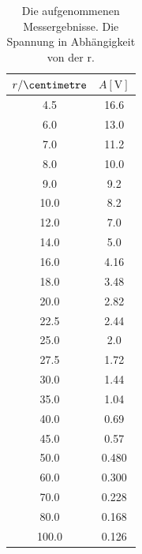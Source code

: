 \begin{table}
  \centering
  \caption{Die aufgenommenen Messergebnisse. Die Spannung in Abhängigkeit von der r. } 
  \label{tab:data_dioden}
  \begin{tabular}{c c}
    \toprule
    $r / \si{\centimetre}$ & $A [\si{\volt}]$\\
    \midrule
    4.5    &   16.6  \\
  6.0    &   13.0  \\
  7.0    &   11.2  \\
  8.0    &   10.0  \\
  9.0    &   9.2   \\
  10.0   &   8.2   \\
  12.0   &   7.0   \\
  14.0   &   5.0   \\
  16.0   &   4.16  \\
  18.0   &   3.48  \\
  20.0   &   2.82  \\
  22.5   &   2.44  \\
  25.0   &   2.0   \\
  27.5   &   1.72  \\
  30.0   &   1.44  \\
  35.0   &   1.04  \\
  40.0   &   0.69  \\
  45.0   &   0.57  \\
  50.0   &   0.480  \\
  60.0   &   0.300  \\
  70.0   &   0.228  \\
  80.0   &   0.168  \\
  100.0  &   0.126  \\
    \bottomrule
  \end{tabular}
\end{table}
